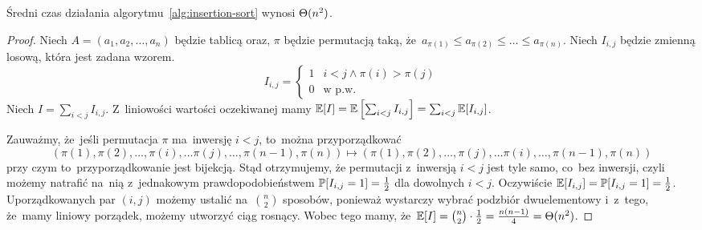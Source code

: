 \begin{fact}
    Średni czas działania algorytmu~\ref{alg:insertion-sort}
    wynosi \( \Theta (n^2) \).
\end{fact}
\begin{proof}
    Niech \( A = (a_1, a_2, \dotsc, a_n) \) będzie
    tablicą oraz, \( \pi \) będzie permutacją
    taką, że~\( a_{\pi(1)} \le a_{\pi(2)} 
    \le \dotsc \le a_{\pi(n)} \).
    Niech \( I_{i,j} \) będzie zmienną losową, która 
    jest zadana wzorem.
    \begin{equation*}
        I_{i,j} = \begin{cases}
            1 & i < j \wedge \pi(i) > \pi(j) \\
            0 & \text{w p.w.}
        \end{cases}
    \end{equation*}
    Niech \( I = \sum_{i < j} I_{i, j} \).
    Z~liniowości wartości oczekiwanej mamy 
    \( \operatorname{\mathbb{E}} [I] = \operatorname{\mathbb{E}} \left[ \sum_{i < j} I_{i, j} \right] 
    = \sum_{i < j} \operatorname{\mathbb{E}} [I_{i, j}] \).

    Zauważmy, że~jeśli permutacja \( \pi \)
    ma~inwersję \( i < j \), to~można przyporządkować 
    \begin{equation*}
        (\pi(1), \pi(2), \dotsc, \pi(i), \dotsc \pi(j), \dotsc, 
        \pi(n - 1), \pi(n)) \mapsto 
        (\pi(1), \pi(2), \dotsc, \pi(j), \dotsc \pi(i), \dotsc, 
        \pi(n - 1), \pi(n))
    \end{equation*}
    przy czym
    to~przyporządkowanie jest bijekcją.
    Stąd otrzymujemy, że permutacji z~inwersją \( i < j \)
    jest tyle samo, co~bez inwersji, czyli możemy
    natrafić na~nią z~jednakowym prawdopodobieństwem
    \( \operatorname{\mathbb{P}} [I_{i, j} = 1] = \frac{1}{2} \) dla dowolnych
    \( i < j \). Oczywiście \( \operatorname{\mathbb{E}} [I_{i, j}] 
    = \operatorname{\mathbb{P}} [I_{i, j} = 1] = \frac{1}{2} \).
    Uporządkowanych par \( (i, j) \) możemy 
    ustalić na~\( \binom{n}{2} \) sposobów,
    ponieważ wystarczy wybrać podzbiór dwuelementowy
    i~z~tego, że~mamy liniowy porządek, możemy
    utworzyć ciąg rosnący.
    Wobec tego mamy, 
    że~\( \operatorname{\mathbb{E}} [I] = \binom{n}{2} \cdot \frac{1}{2} 
    = \frac{n(n - 1)}{4} = \Theta (n^2) \).
\end{proof}